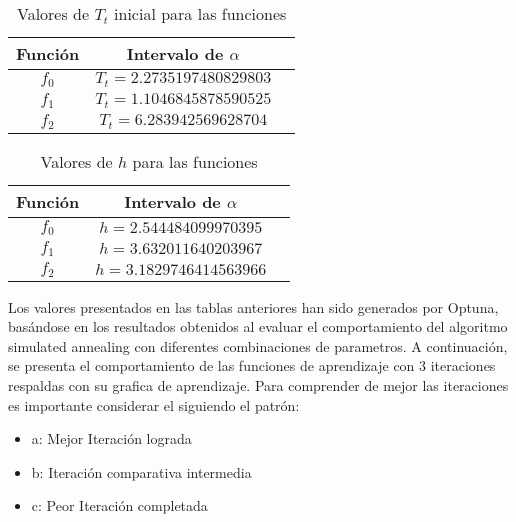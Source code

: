 \begin{table}[H]
    \centering
    \caption{Valores de $T_t$ inicial para las funciones}
    \begin{tabular}{|c|c|c|}
    \hline
    \textbf{Función} & \textbf{Intervalo de $\alpha$} \\
    \hline
    $f_0$ & $T_t = 2.2735197480829803$ \\
    \hline
    $f_1$ & $T_t = 1.1046845878590525$ \\
    \hline
    $f_2$ & $T_t = 6.283942569628704$ \\
    \hline
    \end{tabular}
    \label{tab:valores-alpha-simul_f1}
\end{table}

\begin{table}[H]
    \centering
    \caption{Valores de $h$ para las funciones}
    \begin{tabular}{|c|c|c|}
    \hline
    \textbf{Función} & \textbf{Intervalo de $\alpha$} \\
    \hline
    $f_0$ & $h = 2.544484099970395$ \\
    \hline
    $f_1$ & $h = 3.632011640203967$ \\
    \hline
    $f_2$ & $h = 3.1829746414563966$ \\
    \hline
    \end{tabular}
    \label{tab:valores-alpha-simul_f2}
\end{table}

Los valores presentados en las tablas anteriores han sido generados por Optuna, basándose en los resultados obtenidos al evaluar el comportamiento del algoritmo simulated annealing con diferentes combinaciones de parametros. A continuación, se presenta el comportamiento de las funciones de aprendizaje con 3 iteraciones respaldas con su grafica de aprendizaje.
Para comprender de mejor las iteraciones es importante considerar el siguiendo el patrón:

\begin{itemize}
\item a: Mejor Iteración lograda
\item b: Iteración comparativa intermedia
\item c: Peor Iteración completada
\end{itemize}

